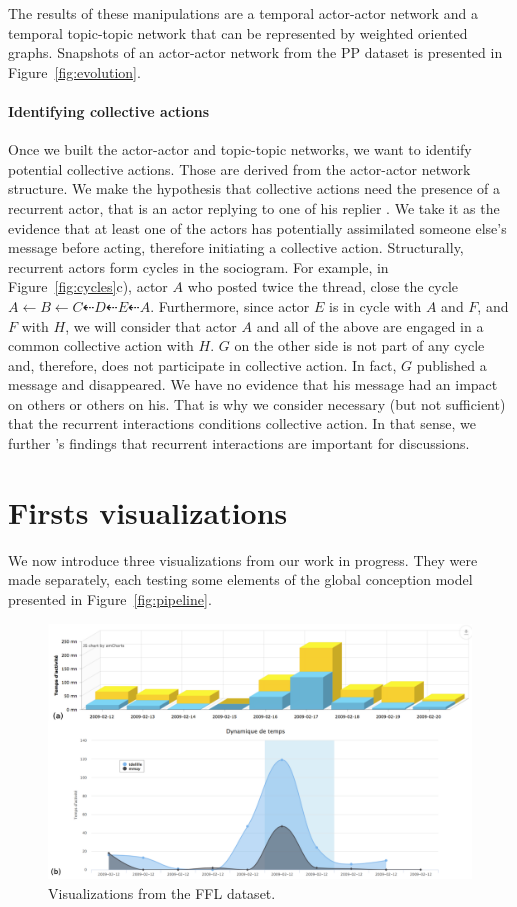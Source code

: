 \documentclass[a4paper,twoside]{article}
\begin{document}
The results of these manipulations are a temporal actor-actor network and a temporal topic-topic network that can be represented by weighted oriented graphs.  Snapshots of an actor-actor network from the PP dataset is presented in Figure~\ref{fig:evolution}.

\paragraph{Identifying collective actions}

Once we built the actor-actor and topic-topic networks, we want to identify potential collective actions.  Those are derived from the actor-actor network structure.
We make the hypothesis that collective actions need the presence of a recurrent actor, that is an actor replying to one of his replier \citep{Chua2017}.  We take it as the evidence that at least one of the actors has potentially assimilated someone else's message before acting, therefore initiating a collective action.
Structurally, recurrent actors form cycles in the sociogram.  For example, in Figure~\ref{fig:cycles}c), actor $A$ who posted twice the thread, close the cycle $A \leftarrow B \leftarrow C \dashleftarrow D \dashleftarrow E \dashleftarrow A$.  Furthermore, since actor $E$ is in cycle with $A$ and $F$, and $F$ with $H$, we will consider that actor $A$ and all of the above are engaged in a common collective action with $H$.  $G$ on the other side is not part of any cycle and, therefore, does not participate in collective action.  In fact, $G$ published a message and disappeared.  We have no evidence that his message had an impact on others or others on his.  That is why we consider necessary (but not sufficient) that the recurrent interactions conditions collective action.   In that sense, we further \cite{Chua2017}'s findings that recurrent interactions are important for discussions.

\section{Firsts visualizations}
\label{section:5}

We now introduce three visualizations from our work in progress.  They were made separately, each testing some elements of the global conception model presented in Figure~\ref{fig:pipeline}.


\begin{figure}[t]
 \includegraphics[width=.5\textwidth]{images/dynco_portrait.png}
 \small{
  \caption{\label{fig:dynco}
   Visualizations from the FFL dataset.
  }}
\end{figure}
\end{document}
